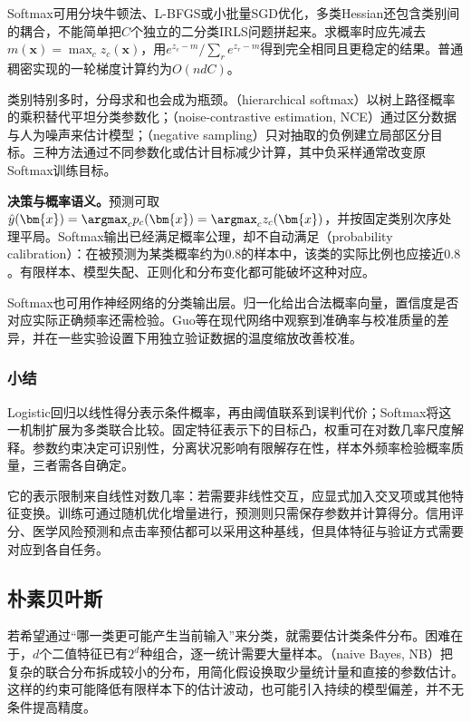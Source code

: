 Softmax可用分块牛顿法、L-BFGS或小批量SGD优化，多类Hessian还包含类别间的耦合，不能简单把$C$个独立的二分类IRLS问题拼起来。求概率时应先减去$m(\bm{x})=\max_c z_c(\bm{x})$，用$e^{z_c-m}/\sum_r e^{z_r-m}$得到完全相同且更稳定的结果。普通稠密实现的一轮梯度计算约为$O(ndC)$。

类别特别多时，分母求和也会成为瓶颈。（hierarchical softmax）以树上路径概率的乘积替代平坦分类参数化；（noise-contrastive estimation, NCE）通过区分数据与人为噪声来估计模型；（negative sampling）只对抽取的负例建立局部区分目标。三种方法通过不同参数化或估计目标减少计算，其中负采样通常改变原Softmax训练目标。

\textbf{决策与概率语义。}预测可取$\hat y(\bm{x})=\argmax_c p_c(\bm{x})=\argmax_c z_c(\bm{x})$，并按固定类别次序处理平局。Softmax输出已经满足概率公理，却不自动满足（probability calibration）：在被预测为某类概率约为$0.8$的样本中，该类的实际比例也应接近$0.8$。有限样本、模型失配、正则化和分布变化都可能破坏这种对应。

Softmax也可用作神经网络的分类输出层。归一化给出合法概率向量，置信度是否对应实际正确频率还需检验。Guo等在现代网络中观察到准确率与校准质量的差异，并在一些实验设置下用独立验证数据的温度缩放改善校准。

\subsubsection{小结}
\label{sec:classification-logistic-summary}

Logistic回归以线性得分表示条件概率，再由阈值联系到误判代价；Softmax将这一机制扩展为多类联合比较。固定特征表示下的目标凸，权重可在对数几率尺度解释。参数约束决定可识别性，分离状况影响有限解存在性，样本外频率检验概率质量，三者需各自确定。

它的表示限制来自线性对数几率：若需要非线性交互，应显式加入交叉项或其他特征变换。训练可通过随机优化增量进行，预测则只需保存参数并计算得分。信用评分、医学风险预测和点击率预估都可以采用这种基线，但具体特征与验证方式需要对应到各自任务。

\subsection{朴素贝叶斯}
\label{sec:classification-naive-bayes}

若希望通过“哪一类更可能产生当前输入”来分类，就需要估计类条件分布。困难在于，$d$个二值特征已有$2^d$种组合，逐一统计需要大量样本。（naive Bayes, NB）把复杂的联合分布拆成较小的分布，用简化假设换取少量统计量和直接的参数估计。这样的约束可能降低有限样本下的估计波动，也可能引入持续的模型偏差，并不无条件提高精度。

